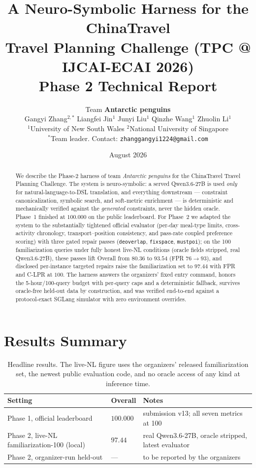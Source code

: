 \documentclass[11pt,a4paper]{article}
\title{\bf A Neuro-Symbolic Harness for the ChinaTravel\\
Travel Planning Challenge (TPC @ IJCAI-ECAI 2026)\\[2mm]
\large Phase 2 Technical Report}
\author{%
Team \textbf{Antarctic penguins}\\[1mm]
\small Gangyi Zhang$^{2,*}$ \quad Liangfei Jin$^{1}$ \quad Junyi Liu$^{1}$ \quad
Qinzhe Wang$^{1}$ \quad Zhuolin Li$^{1}$\\
\small $^{1}$University of New South Wales \qquad $^{2}$National University of Singapore\\
\small $^{*}$Team leader. \quad Contact: \texttt{zhanggangyi1224@gmail.com}
}
\date{August 2026}
\begin{document}
\maketitle

\begin{abstract}
We describe the Phase-2 harness of team \emph{Antarctic penguins} for the
ChinaTravel Travel Planning Challenge. The system is neuro-symbolic: a served
Qwen3.6-27B is used \emph{only} for natural-language-to-DSL translation, and
everything downstream --- constraint canonicalization, symbolic search, and
soft-metric enrichment --- is deterministic and mechanically verified against
the \emph{generated} constraints, never the hidden oracle. Phase~1 finished at
$100.000$ on the public leaderboard. For Phase~2 we adapted the system to the
substantially tightened official evaluator (per-day meal-type limits,
cross-activity chronology, transport--position consistency, and pass-rate
coupled preference scoring) with three gated repair passes
(\texttt{deoverlap}, \texttt{fixspace}, \texttt{mustpoi}); on the 100
familiarization queries under fully honest live-NL conditions
(oracle fields stripped, real Qwen3.6-27B), these passes lift Overall from
$80.36$ to $93.54$ (FPR $76\!\to\!93$), and disclosed per-instance
targeted repairs raise the familiarization set to $\mathbf{97.44}$ with
FPR and C-LPR at $100$.
The harness answers the organizers' fixed entry command, honors the
5-hour/100-query budget with per-query caps and a deterministic fallback,
survives oracle-free held-out data by construction, and was verified
end-to-end against a protocol-exact SGLang simulator with zero environment
overrides.
\end{abstract}

\section{Results Summary}

\begin{table}[h]
\centering
\small
\begin{tabular}{lll}
\toprule
Setting & Overall & Notes\\
\midrule
Phase 1, official leaderboard & $\mathbf{100.000}$ & submission v13; all seven metrics at 100\\
Phase 2, live-NL familiarization-100 (local) & $\mathbf{97.44}$ & real Qwen3.6-27B, oracle stripped, latest evaluator\\
Phase 2, organizer-run held-out & --- & to be reported by the organizers\\
\bottomrule
\end{tabular}
\caption{Headline results. The live-NL figure uses the organizers' released
familiarization set, the newest public evaluation code, and no oracle access
of any kind at inference time.}
\end{table}
\end{document}
